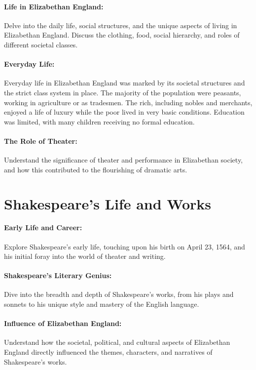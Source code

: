 \documentclass[a4paper,12pt]{book}
\begin{document}
\paragraph{Life in Elizabethan England:}
Delve into the daily life, social structures, and the unique aspects of living in Elizabethan England. Discuss the clothing, food, social hierarchy, and roles of different societal classes. 

\paragraph{Everyday Life:}
Everyday life in Elizabethan England was marked by its societal structures and the strict class system in place. The majority of the population were peasants, working in agriculture or as tradesmen. The rich, including nobles and merchants, enjoyed a life of luxury while the poor lived in very basic conditions. Education was limited, with many children receiving no formal education.

\paragraph{The Role of Theater:}
Understand the significance of theater and performance in Elizabethan society, and how this contributed to the flourishing of dramatic arts.

\section*{Shakespeare’s Life and Works}

\paragraph{Early Life and Career:}
Explore Shakespeare’s early life, touching upon his birth on April 23, 1564, and his initial foray into the world of theater and writing.

\paragraph{Shakespeare’s Literary Genius:}
Dive into the breadth and depth of Shakespeare’s works, from his plays and sonnets to his unique style and mastery of the English language.

\paragraph{Influence of Elizabethan England:}
Understand how the societal, political, and cultural aspects of Elizabethan England directly influenced the themes, characters, and narratives of Shakespeare’s works.
\end{document}

